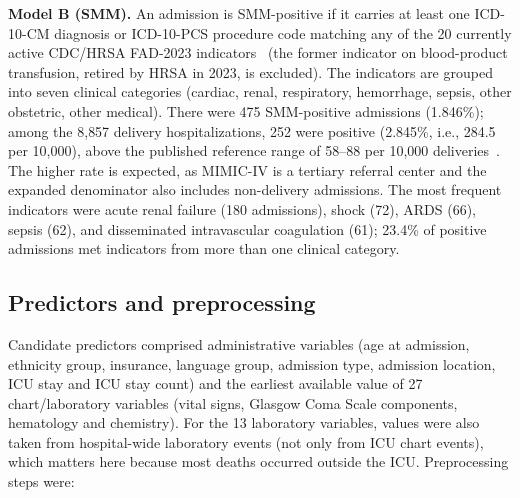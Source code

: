 \documentclass[healthcare,article,submit,pdftex,moreauthors]{Definitions/mdpi}
\begin{document}
\textbf{Model B (SMM).} An admission is SMM-positive if it carries at least one
ICD-10-CM diagnosis or ICD-10-PCS procedure code matching any of the 20 currently
active CDC/HRSA FAD-2023 indicators~\cite{CDC2023SMM,HRSA2023FAD,Nebraska2024SMM}
(the former indicator on blood-product transfusion, retired by HRSA in 2023, is
excluded). The indicators are grouped into seven clinical categories (cardiac,
renal, respiratory, hemorrhage, sepsis, other obstetric, other medical). There were
475 SMM-positive admissions (1.846\%); among the 8{,}857 delivery hospitalizations,
252 were positive (2.845\%, i.e., 284.5 per 10{,}000), above the published
reference range of 58--88 per 10{,}000 deliveries~\cite{Nebraska2024SMM}.
The higher rate is expected, as MIMIC-IV is a tertiary referral center and the
expanded denominator also includes non-delivery admissions.
The most frequent indicators were acute renal failure (180 admissions), shock (72),
ARDS (66), sepsis (62), and disseminated intravascular coagulation (61); 23.4\% of
positive admissions met indicators from more than one clinical category.

\subsection{Predictors and preprocessing}
Candidate predictors comprised administrative variables (age at admission,
ethnicity group, insurance, language group, admission type, admission location,
ICU stay and ICU stay count) and the earliest available value of 27 chart/laboratory
variables (vital signs, Glasgow Coma Scale components, hematology and chemistry).
For the 13 laboratory variables, values were also taken from hospital-wide
laboratory events (not only from ICU chart events), which matters here
because most deaths occurred outside the ICU. Preprocessing steps were:
\end{document}

